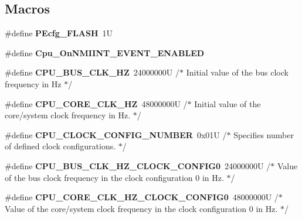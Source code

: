 \subsection*{Macros}
\begin{DoxyCompactItemize}
\item 
\hypertarget{group___cpu__module_gae2f84b335ab99b9e98d41e8a530b1540}{\#define {\bfseries P\-Ecfg\-\_\-\-F\-L\-A\-S\-H}~1\-U}\label{group___cpu__module_gae2f84b335ab99b9e98d41e8a530b1540}

\item 
\hypertarget{group___cpu__module_gabd20462878cd6205dd20d3303b46b3cb}{\#define {\bfseries Cpu\-\_\-\-On\-N\-M\-I\-I\-N\-T\-\_\-\-E\-V\-E\-N\-T\-\_\-\-E\-N\-A\-B\-L\-E\-D}}\label{group___cpu__module_gabd20462878cd6205dd20d3303b46b3cb}

\item 
\hypertarget{group___cpu__module_ga532954dc988486bfe48200c796380120}{\#define {\bfseries C\-P\-U\-\_\-\-B\-U\-S\-\_\-\-C\-L\-K\-\_\-\-H\-Z}~24000000\-U /$\ast$ Initial value of the bus clock frequency in Hz $\ast$/}\label{group___cpu__module_ga532954dc988486bfe48200c796380120}

\item 
\hypertarget{group___cpu__module_ga9dee0abd722c849e54c662ab11a1d2cf}{\#define {\bfseries C\-P\-U\-\_\-\-C\-O\-R\-E\-\_\-\-C\-L\-K\-\_\-\-H\-Z}~48000000\-U /$\ast$ Initial value of the core/system clock frequency in Hz.  $\ast$/}\label{group___cpu__module_ga9dee0abd722c849e54c662ab11a1d2cf}

\item 
\hypertarget{group___cpu__module_ga37d43e31f65dd620040aec363e95b5a8}{\#define {\bfseries C\-P\-U\-\_\-\-C\-L\-O\-C\-K\-\_\-\-C\-O\-N\-F\-I\-G\-\_\-\-N\-U\-M\-B\-E\-R}~0x01\-U /$\ast$ Specifies number of defined clock configurations. $\ast$/}\label{group___cpu__module_ga37d43e31f65dd620040aec363e95b5a8}

\item 
\hypertarget{group___cpu__module_ga39018ca5854bea36700d3b30f6c08195}{\#define {\bfseries C\-P\-U\-\_\-\-B\-U\-S\-\_\-\-C\-L\-K\-\_\-\-H\-Z\-\_\-\-C\-L\-O\-C\-K\-\_\-\-C\-O\-N\-F\-I\-G0}~24000000\-U /$\ast$ Value of the bus clock frequency in the clock configuration 0 in Hz. $\ast$/}\label{group___cpu__module_ga39018ca5854bea36700d3b30f6c08195}

\item 
\hypertarget{group___cpu__module_ga64b9007ea0c78e588ed565373bcec805}{\#define {\bfseries C\-P\-U\-\_\-\-C\-O\-R\-E\-\_\-\-C\-L\-K\-\_\-\-H\-Z\-\_\-\-C\-L\-O\-C\-K\-\_\-\-C\-O\-N\-F\-I\-G0}~48000000\-U /$\ast$ Value of the core/system clock frequency in the clock configuration 0 in Hz. $\ast$/}\label{group___cpu__module_ga64b9007ea0c78e588ed565373bcec805}


\end{DoxyCompactItemize}
